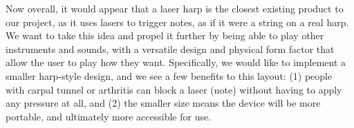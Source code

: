 Now overall, it would appear that a laser harp is the closest existing product to our project, as it uses lasers to trigger notes, as if it were a string on a real harp. We want to take this idea and propel it further by being able to play other instruments and sounds, with a versatile design and physical form factor that allow the user to play how they want. Specifically, we would like to implement a smaller harp-style design, and we see a few benefits to this layout: (1) people with carpal tunnel or arthritis can block a laser (note) without having to apply any pressure at all, and (2) the smaller size means the device will be more portable, and ultimately more accessible for use.  
